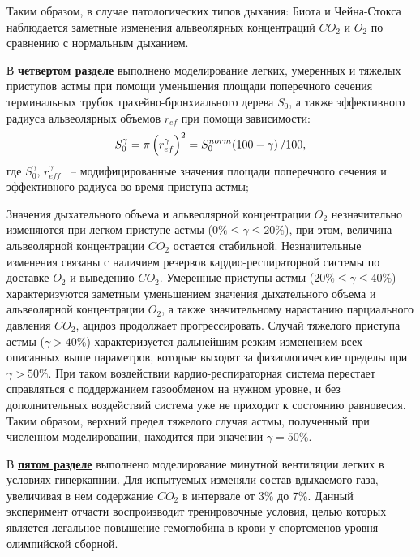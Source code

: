 Таким образом, в случае патологических типов дыхания: Биота и Чейна-Стокса наблюдается заметные изменения альвеолярных концентраций $CO_{2} $ и $O_{2} $ по сравнению с нормальным дыханием.

В \underline{\textbf{четвертом разделе}} выполнено моделирование легких, умеренных и тяжелых приступов астмы при помощи уменьшения площади поперечного сечения терминальных трубок трахейно-бронхиального дерева $S_{0} $, а также эффективного радиуса альвеолярных объемов $r_{ef} $ при помощи зависимости:
\begin{equation} \label{GrindEQ__43_} 
S_{0}^{\gamma } =\pi \left(r_{ef}^{\gamma } \right)^{2} =S_{0}^{norm} {\left(100-\gamma \right)\mathord{\left/ {\vphantom {\left(100-\gamma \right) 100}} \right. \kern-\nulldelimiterspace} 100} ,  
\end{equation} 
где $S_{0}^{\gamma } $, $r_{eff}^{\gamma } $ ~-- модифицированные значения площади поперечного сечения и эффективного радиуса во время приступа астмы;

Значения дыхательного объема и альвеолярной концентрации $O_{2} $ незначительно изменяются при легком приступе астмы ($0\% \le \gamma \le 20\% $), при этом, величина альвеолярной концентрации $CO_{2} $ остается стабильной. Незначительные изменения связаны с наличием резервов кардио-респираторной системы по доставке  $O_{2} $ и выведению  $CO_{2} $. Умеренные приступы астмы ($20\% \le \gamma \le 40\% $) характеризуются заметным уменьшением значения дыхательного объема и альвеолярной концентрации $O_{2} $, а также значительному нарастанию парциального давления $CO_{2} $, ацидоз продолжает прогрессировать. Случай тяжелого приступа астмы ($\gamma >40\% $) характеризуется дальнейшим резким изменением всех описанных выше параметров, которые выходят за физиологические пределы при $\gamma >50\% $. При таком воздействии кардио-респираторная система перестает справляться с поддержанием газообменом на нужном уровне, и без дополнительных воздействий система уже не приходит к состоянию равновесия. Таким образом, верхний предел тяжелого случая астмы, полученный при численном моделировании, находится при значении $\gamma =50\% $.

В \underline{\textbf{пятом разделе}} выполнено моделирование минутной вентиляции легких в условиях гиперкапнии. Для испытуемых изменяли состав вдыхаемого газа, увеличивая в нем содержание \(CO_{2}\) в интервале от 3\% до 7\%. Данный эксперимент отчасти воспроизводит тренировочные условия, целью которых является легальное повышение гемоглобина в крови у спортсменов уровня олимпийской сборной.

